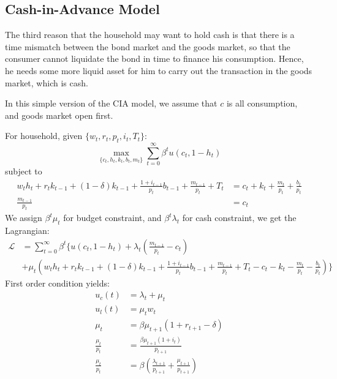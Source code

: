 \documentclass[12pt]{article}
\begin{document}
\subsection{Cash-in-Advance Model}
The third reason that the household may want to hold cash is that there is a time mismatch between the bond market and the goods market, so that the consumer cannot liquidate the bond in time to finance his consumption. Hence, he needs some more liquid asset for him to carry out the transaction in the goods market, which is cash.

In this simple version of the CIA model, we assume that $c$ is all consumption, and goods market open first. 

For household, given $\{w_t, r_t, p_t, i_t, T_t\}$:
\begin{equation}
	\max_{\{c_t, h_t, k_t, b_t, m_t\}} \sum_{t=0}^\infty \beta^tu(c_t, 1-h_t)
\end{equation}
subject to
\begin{align}
	w_th_t + r_t k_{t-1} + (1-\delta)k_{t-1} + \frac{1+i_{t-1}}{p_t}b_{t-1} + \frac{m_{t-1}}{p_t} + T_t &= c_t + k_t + \frac{m_t}{p_t} + \frac{b_t}{p_t}\\
	\frac{m_{t-1}}{p_t} &= c_t
\end{align}
We assign $\beta^t\mu_t$ for budget constraint, and $\beta^t\lambda_t$ for cash constraint, we get the Lagrangian:
\begin{align*}
	\mathcal{L} & = \sum_{t=0}^\infty \beta^t \Bigg\{ u(c_t, 1-h_t) + \lambda_t(\frac{m_{t-1}}{p_t} - c_t) \\ 
	& + \mu_t(w_th_t + r_t k_{t-1} + (1-\delta)k_{t-1} + \frac{1+i_{t-1}}{p_t}b_{t-1} + \frac{m_{t-1}}{p_t} + T_t - c_t - k_t - \frac{m_t}{p_t} - \frac{b_t}{p_t}) \Bigg\}
\end{align*}
First order condition yields:
\begin{align}
	u_c(t) &= \lambda_t + \mu_t\\
	u_l(t) &= \mu_t w_t\\
	\mu_t &= \beta \mu_{t+1}(1 + r_{t+1} - \delta) \label{eq:cia_k}\\
	\frac{\mu_t}{p_t} &= \frac{\beta \mu_{t+1}(1 + i_t)}{p_{t+1}} \label{eq:cia_b}\\
	\frac{\mu_t}{p_t} &= \beta(\frac{\lambda_{t+1}}{p_{t+1}} + \frac{\mu_{t+1}}{p_{t+1}}) \label{eq:cia_m}
\end{align}
\end{document}
